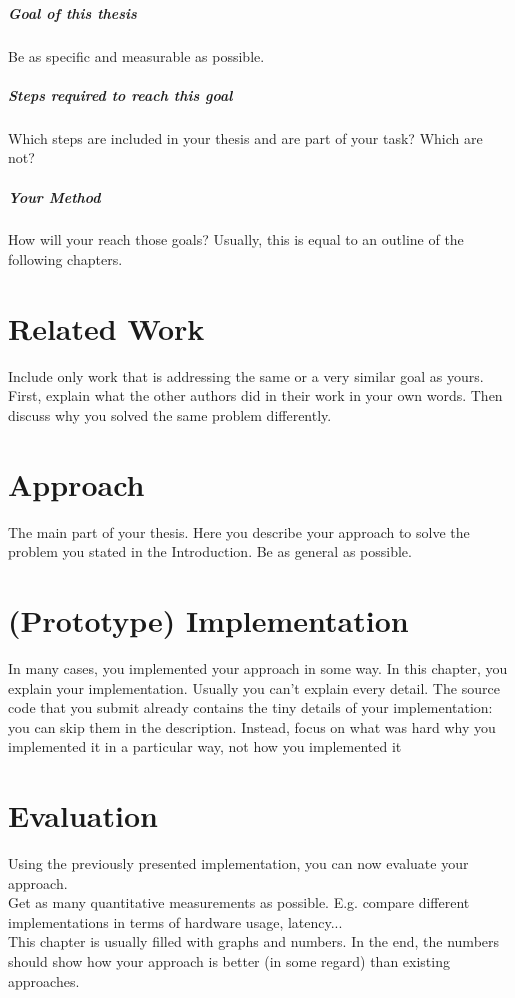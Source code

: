 \documentclass{listhesis}
\begin{document}
\paragraph{Goal of this thesis}
Be as specific and measurable as possible.

\paragraph{Steps required to reach this goal}
Which steps are included in your thesis and are part of your task?
Which are not?

\paragraph{Your Method}
How will your reach those goals? Usually, this is equal to an outline of
the following chapters.

\chapter{Related Work}
Include only work that is addressing the same or a very similar goal as
yours.  First, explain what the other authors did in their work in your
own words. Then discuss why you solved the same problem differently.

\chapter{Approach}
The main part of your thesis. Here you describe your approach to solve
the problem you stated in the Introduction.  Be as general as possible.

\chapter{(Prototype) Implementation}
In many cases, you implemented your approach in some way. In this
chapter, you explain your implementation.  Usually you can't explain
every detail. The source code that you submit already contains the tiny
details of your implementation: you can skip them in the
description. Instead, focus on what was hard why you implemented it in a
particular way, not how you implemented it

\chapter{Evaluation}
Using the previously presented implementation, you can now evaluate your approach.\\
Get as many quantitative measurements as possible.  E.g. compare
different implementations in terms of hardware usage, latency...\\
This chapter is usually filled with graphs and numbers.  In the end, the
numbers should show how your approach is better (in some regard) than
existing approaches.
\end{document}
